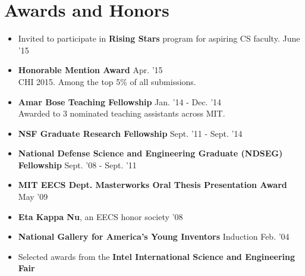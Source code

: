 \documentclass[margin]{res}
\begin{document}
\begin{resume}
\begin{itemize}[leftmargin=*]
\end{itemize}

\section{Awards and Honors} 

\begin{itemize}[leftmargin=*] \itemsep -2pt

\item Invited to participate in {\bf Rising Stars} program for aspiring CS faculty. \hfill June '15

\item {\bf Honorable Mention Award} \hfill Apr. '15
\\CHI 2015. Among the top 5\% of all submissions.

\item {\bf Amar Bose Teaching Fellowship} \hfill Jan. '14 - Dec. '14 \\Awarded to 3 nominated teaching assistants across MIT. 

\item {\bf NSF Graduate Research Fellowship} \hfill Sept. '11 - Sept. '14

\item {\bf National Defense Science and Engineering Graduate (NDSEG) \\ Fellowship} \hfill Sept. '08 - Sept. '11
          
\item {\bf MIT EECS Dept. Masterworks Oral Thesis Presentation Award} \hfill May '09   

\item {\bf Eta Kappa Nu}, an EECS honor society \hfill '08

\item {\bf National Gallery for America's Young Inventors} Induction \hfill Feb. '04

\item Selected awards from the {\bf Intel International Science and Engineering Fair}
\begin{itemize}[leftmargin=*] \itemsep -2pt




\end{itemize}
\end{itemize}
\end{resume}
\end{document}
